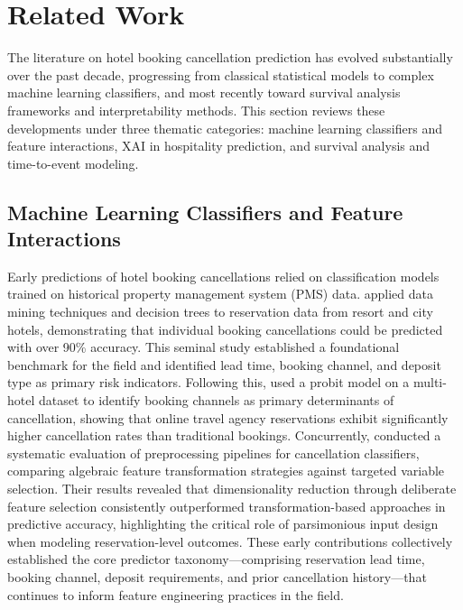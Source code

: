 \documentclass[pdflatex,sn-mathphys-ay]{sn-jnl}
\theoremstyle{thmstyleone}%
\theoremstyle{thmstyletwo}%
\theoremstyle{thmstylethree}%
\begin{document}
\section{Related Work}
\label{sec:related_work}

The literature on hotel booking cancellation prediction has evolved substantially over the past decade, progressing from classical statistical models to complex machine learning classifiers, and most recently toward survival analysis frameworks and interpretability methods. This section reviews these developments under three thematic categories: machine learning classifiers and feature interactions, XAI in hospitality prediction, and survival analysis and time-to-event modeling.

\subsection{Machine Learning Classifiers and Feature Interactions}

Early predictions of hotel booking cancellations relied on classification models trained on historical property management system (PMS) data. \cite{antonio2017predicting} applied data mining techniques and decision trees to reservation data from resort and city hotels, demonstrating that individual booking cancellations could be predicted with over 90\% accuracy. This seminal study established a foundational benchmark for the field and identified lead time, booking channel, and deposit type as primary risk indicators. Following this, \cite{falk2018modelling} used a probit model on a multi-hotel dataset to identify booking channels as primary determinants of cancellation, showing that online travel agency reservations exhibit significantly higher cancellation rates than traditional bookings. Concurrently, \cite{satu2020performance} conducted a systematic evaluation of preprocessing pipelines for cancellation classifiers, comparing algebraic feature transformation strategies against targeted variable selection. Their results revealed that dimensionality reduction through deliberate feature selection consistently outperformed transformation-based approaches in predictive accuracy, highlighting the critical role of parsimonious input design when modeling reservation-level outcomes. These early contributions collectively established the core predictor taxonomy—comprising reservation lead time, booking channel, deposit requirements, and prior cancellation history—that continues to inform feature engineering practices in the field.
\end{document}
